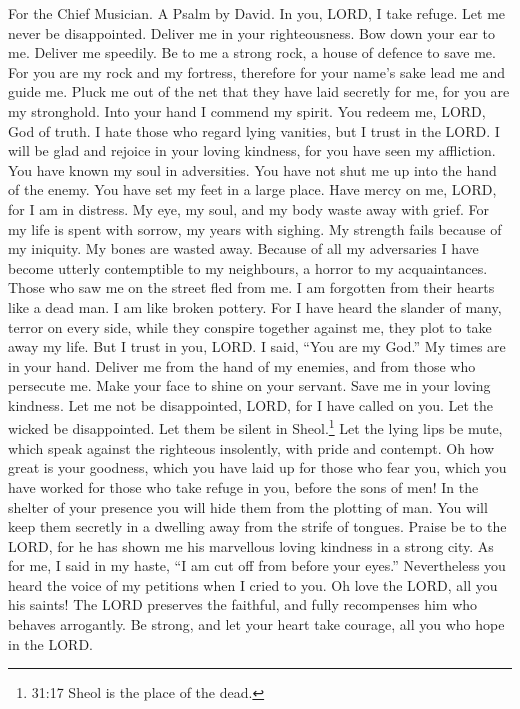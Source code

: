 For the Chief Musician. A Psalm by David.  In you, LORD, I
take refuge. Let me never be disappointed. Deliver me in your
righteousness.  Bow down your ear to me. Deliver me
speedily. Be to me a strong rock, a house of defence to save me.
 For you are my rock and my fortress, therefore for your
name's sake lead me and guide me.  Pluck me out of the net
that they have laid secretly for me, for you are my stronghold.
 Into your hand I commend my spirit. You redeem me, LORD,
God of truth.  I hate those who regard lying vanities, but I
trust in the LORD.  I will be glad and rejoice in your
loving kindness, for you have seen my affliction. You have known my soul
in adversities.  You have not shut me up into the hand of
the enemy. You have set my feet in a large place.  Have
mercy on me, LORD, for I am in distress. My eye, my soul, and my body
waste away with grief.  For my life is spent with sorrow,
my years with sighing. My strength fails because of my iniquity. My
bones are wasted away.  Because of all my adversaries I
have become utterly contemptible to my neighbours, a horror to my
acquaintances. Those who saw me on the street fled from me.
 I am forgotten from their hearts like a dead man. I am
like broken pottery.  For I have heard the slander of many,
terror on every side, while they conspire together against me, they plot
to take away my life.  But I trust in you, LORD. I said,
``You are my God.''  My times are in your hand. Deliver me
from the hand of my enemies, and from those who persecute me.
 Make your face to shine on your servant. Save me in your
loving kindness.  Let me not be disappointed, LORD, for I
have called on you. Let the wicked be disappointed. Let them be silent
in Sheol.\footnote{31:17 Sheol is the place of the dead.} 
Let the lying lips be mute, which speak against the righteous
insolently, with pride and contempt.  Oh how great is your
goodness, which you have laid up for those who fear you, which you have
worked for those who take refuge in you, before the sons of men!
 In the shelter of your presence you will hide them from
the plotting of man. You will keep them secretly in a dwelling away from
the strife of tongues.  Praise be to the LORD, for he has
shown me his marvellous loving kindness in a strong city. 
As for me, I said in my haste, ``I am cut off from before your eyes.''
Nevertheless you heard the voice of my petitions when I cried to you.
 Oh love the LORD, all you his saints! The LORD preserves
the faithful, and fully recompenses him who behaves arrogantly.
 Be strong, and let your heart take courage, all you who
hope in the LORD.


